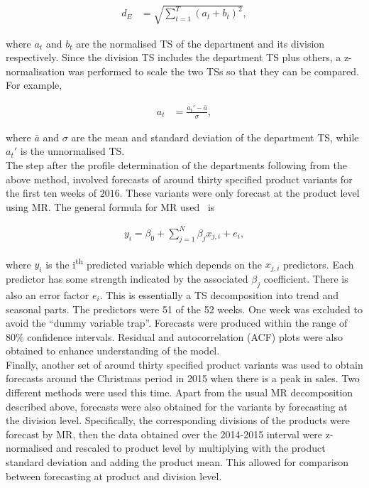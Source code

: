 \documentclass[11pt]{article}
\newcommand{\nth}{\textsuperscript}
\begin{document}
\begin{align}
d_E &= \sqrt{\sum_{t=1}^{T} (a_t + b_t)^2}, \label{ED}
\end{align}

where $a_t$ and $b_t$ are the normalised TS of the department and its division respectively. Since the division TS includes the department TS plus others, a z-normalisation was performed to scale the two TSs so that they can be compared. For example,

\begin{align}
a_t &= \frac{a_t'-\bar{a}}{\sigma}, \label{ZNorm}
\end{align}

where $\bar{a}$ and $\sigma$ are the mean and standard deviation of the department TS, while $a_t'$ is the unnormalised TS.\\

The step after the profile determination of the departments following from the above method, involved forecasts of around thirty specified product variants for the first ten weeks of $2016$. These variants were only forecast at the product level using MR. The general formula for MR used~\cite{Hynd} is

\begin{align}
y_i = \beta_0 + \sum_{j=1}^{N} \beta_j x_{j,i} + e_i, \label{MR}
\end{align}

where $y_i$ is the i\nth{th} predicted variable which depends on the $x_{j,i}$ predictors. Each predictor has some strength indicated by the associated $\beta_j$ coefficient. There is also an error factor $e_i$. This is essentially a TS decomposition into trend and seasonal parts. The predictors were 51 of the 52 weeks. One week was excluded to avoid the ``dummy variable trap''. Forecasts were produced within the range of $80\%$ confidence intervals. Residual and autocorrelation (ACF) plots were also obtained to enhance understanding of the model.\\

Finally, another set of around thirty specified product variants was used to obtain forecasts around the Christmas period in 2015 when there is a peak in sales. Two different methods were used this time. Apart from the usual MR decomposition described above, forecasts were also obtained for the variants by forecasting at the division level. Specifically, the corresponding divisions of the products were forecast by MR, then the data obtained over the 2014-2015 interval were z-normalised and rescaled to product level by multiplying with the product standard deviation and adding the product mean. This allowed for comparison between forecasting at product and division level.
\end{document}
